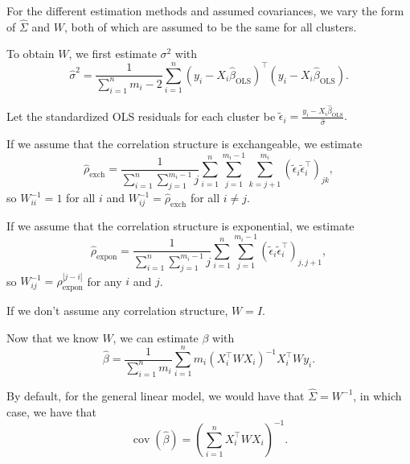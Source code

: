 \documentclass[11pt, letterpaper]{article}
\begin{document}
\begin{description}
  For the different estimation methods and assumed covariances, we vary the form
  of $\hat{\Sigma}$ and $W$, both of which are assumed to be the same for all
  clusters.

  To obtain $W$, we first estimate $\sigma^2$ with
  \begin{equation}
    \hat{\sigma}^2 = \frac{1}{\sum_{i=1}^nm_i - 2}\sum_{i=1}^n
    \left(y_{i} - X_{i}\hat{\beta}_{\mathrm{OLS}}\right)^\intercal
    \left(y_{i} - X_{i}\hat{\beta}_{\mathrm{OLS}}\right).
  \end{equation}


  Let the standardized OLS residuals for each cluster be
  $\tilde{\epsilon}_i = \frac{y_i -
    X_i\hat{\beta}_{\mathrm{OLS}}}{\hat{\sigma}}.$

  If we assume that the correlation structure is exchangeable, we estimate
  \begin{equation}
    \hat{\rho}_{\mathrm{exch}} =
    \frac{1}{\sum_{i=1}^n\sum_{j=1}^{m_i - 1} j}\sum_{i=1}^n\sum_{j=1}^{m_i - 1}\sum_{k=j + 1}^{m_i}
    \left(\tilde{\epsilon}_i\tilde{\epsilon}_i^\intercal\right)_{jk},
  \end{equation}
  so $W^{-1}_{ii} = 1$ for all $i$ and
  $W_{ij}^{-1} = \hat{\rho}_{\mathrm{exch}}$ for all $i \neq j$.

  If we assume that the correlation structure is exponential, we estimate
  \begin{equation} \hat{\rho}_{\mathrm{expon}} =
    \frac{1}{\sum_{i=1}^n\sum_{j=1}^{m_i - 1}
      j}\sum_{i=1}^n\sum_{j=1}^{m_i - 1}
    \left(\tilde{\epsilon}_i\tilde{\epsilon}_i^\intercal\right)_{j,j+1},
  \end{equation}
  so
  $W_{ij}^{-1} = \hat{\rho}_{\mathrm{expon}}^{\left\lvert j - i \right\rvert}$
  for any $i$ and $j$.
  
  If we don't assume any correlation structure, $W = I$.

  Now that we know $W$, we can estimate $\beta$ with
  \begin{equation}
    \hat{\beta} = \frac{1}{\sum_{i=1}^nm_i}\sum_{i=1}^nm_i\left(X_i^\intercal W X_i\right)^{-1} X_i^\intercal W y_i.
  \end{equation}
  
  By default, for the general linear model, we would have that
  $\hat{\Sigma} = W^{-1}$, in which case, we have that
  \begin{equation}
    \operatorname{cov}\left(\hat{\beta}\right)
    = \left(\sum_{i=1}^n X_i^\intercal W X_i\right)^{-1}.
  \end{equation}


\end{description}
\end{document}
